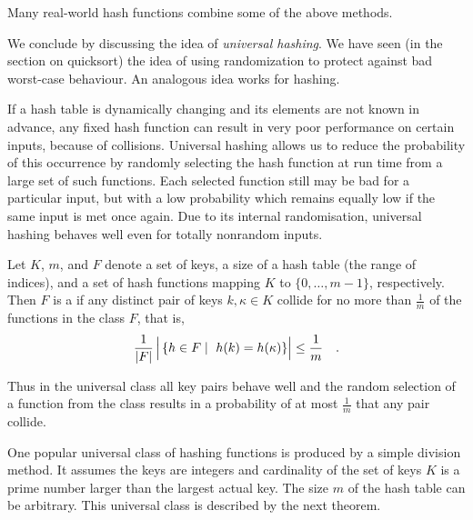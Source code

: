 Many real-world hash functions combine some of the above methods.
                                            
We conclude by discussing the idea of \emph{universal hashing}. We have seen 
(in the section on quicksort) the idea of using randomization to 
protect against bad worst-case behaviour. An analogous idea works for hashing.
                                           
If a hash table is dynamically changing and its elements 
are not known in advance, any fixed hash function can result in 
very poor performance on certain inputs, because of collisions. 
Universal hashing allows us to reduce the probability of this occurrence
by randomly selecting the hash function at run time from a large set
of such functions. Each selected function still may be bad for a
particular input, but with a low probability
which remains equally low if the same input is met once again.
Due to its internal randomisation, universal hashing behaves well even for
totally nonrandom inputs. 

\begin{Definition}
Let \(K\), \(m\), and \(F\) denote
a set of keys, a size of a hash table (the range of indices),
and a set of hash functions mapping \(K\) to \(\{0,\ldots,m-1\}\),
respectively. Then \(F\) is a  if any
distinct pair of keys \(k,\kappa \in {K}\)  collide
for no more than \(\frac{1}{m}\) of the functions in the class \({F}\),
that is,
\[
\frac{1}{|{F}|}
\left| \raisebox{10pt}{} \left\{ h \in {F} \mid \ h(k) = h(\kappa)\right\}\right|
\le \frac{1}{m} \quad .
\]

\end{Definition}
Thus in the universal class all key pairs behave well and the
random selection of a function from the class results in a probability of at most
\(\frac{1}{m}\) that any pair collide.

One popular universal class of hashing functions is produced by
a simple division method. It assumes the keys are integers and
cardinality of
the set of keys \({K}\) is a prime number larger 
than the largest actual key. The size \(m\) of the hash
table can be arbitrary. This universal class is described by
the next theorem.

